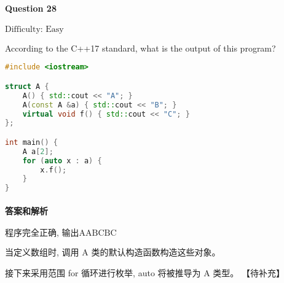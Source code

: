 \documentclass{article}
\begin{document}
	\paragraph*{Question 28} $\boxed{\text{Difficulty: Easy}} $	
	
	According to the C++17 standard, what is the output of this program?	
	
	\begin{lstlisting}[language=C++]
#include <iostream>

struct A {
	A() { std::cout << "A"; }
	A(const A &a) { std::cout << "B"; }
	virtual void f() { std::cout << "C"; }
};

int main() {
	A a[2];
	for (auto x : a) {
		x.f();
	}
}
	\end{lstlisting}
	\paragraph*{答案和解析} $\boxed{\text{程序完全正确, 输出AABCBC}} $
	
	当定义数组时, 调用 A 类的默认构造函数构造这些对象。
	
	接下来采用范围 for 循环进行枚举, auto 将被推导为 A 类型。
	【待补充】
	
\end{document}
